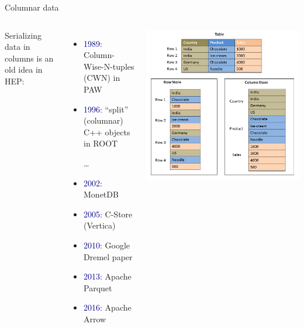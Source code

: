 \documentclass[aspectratio=169]{beamer}
\begin{document}
\begin{frame}{Columnar data}
\vspace{0.35 cm}
\begin{columns}
Serializing data in columns is an old idea in HEP:

\vspace{0.25 cm}
\begin{itemize}
\item \textcolor{darkblue}{1989:} Column-Wise-N-tuples (CWN) in PAW
\item \textcolor{darkblue}{1996:} ``split'' (columnar) C++ objects in ROOT

\vspace{0.25 cm}
\ldots

\vspace{0.25 cm}
\item \textcolor{darkblue}{2002:} MonetDB
\item \textcolor{darkblue}{2005:} C-Store (Vertica)
\item \textcolor{darkblue}{2010:} Google Dremel paper
\item \textcolor{darkblue}{2013:} Apache Parquet
\item \textcolor{darkblue}{2016:} Apache Arrow
\end{itemize}

\includegraphics[width=\linewidth]{columnar-vs-rowwise-sap.png}
\end{columns}
\end{frame}
\end{document}
